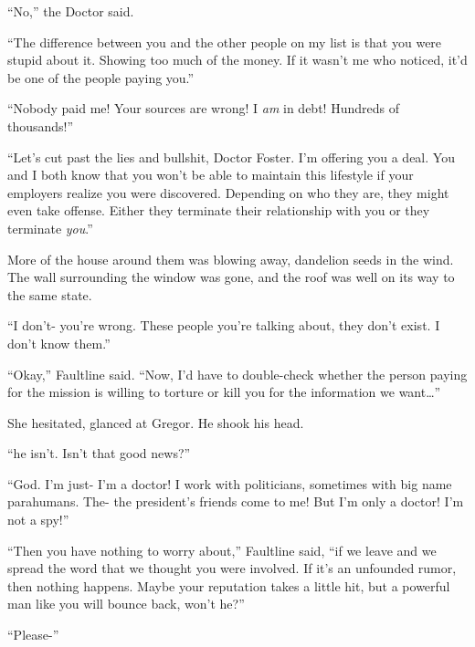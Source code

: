 ``No,'' the Doctor said.



``The difference between you and the other people on my list is that you were stupid about it.  Showing too much of the money.  If it wasn't me who noticed, it'd be one of the people paying you.''



``Nobody paid me!  Your sources are wrong!  I \emph{am} in debt!  Hundreds of thousands!''



``Let's cut past the lies and bullshit, Doctor Foster.  I'm offering you a deal.  You and I both know that you won't be able to maintain this lifestyle if your employers realize you were discovered.  Depending on who they are, they might even take offense.  Either they terminate their relationship with you or they terminate \emph{you}.''



More of the house around them was blowing away, dandelion seeds in the wind.  The wall surrounding the window was gone, and the roof was well on its way to the same state.



``I don't- you're wrong.  These people you're talking about, they don't exist.  I don't know them.''



``Okay,'' Faultline said.  ``Now, I'd have to double-check whether the person paying for the mission is willing to torture or kill you for the information we want\ldots''



She hesitated, glanced at Gregor.  He shook his head.



``\ldotsAnd he isn't.  Isn't that good news?''



``God.  I'm just- I'm a doctor!  I work with politicians, sometimes with big name parahumans.  The- the president's friends come to me!  But I'm only a doctor!  I'm not a spy!''



``Then you have nothing to worry about,'' Faultline said, ``if we leave and we spread the word that we thought you were involved.  If it's an unfounded rumor, then nothing happens.  Maybe your reputation takes a little hit, but a powerful man like you will bounce back, won't he?''



``Please-''




